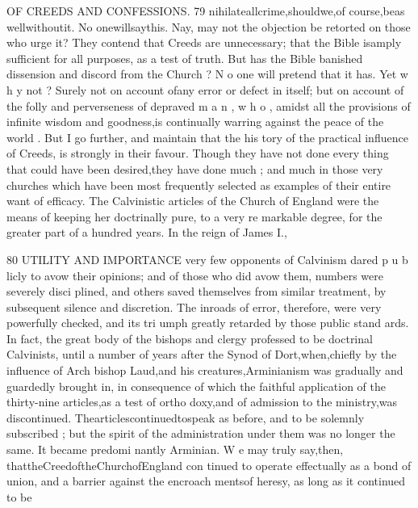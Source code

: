 \documentclass[
]{book}
\begin{document}
OF CREEDS AND CONFESSIONS. 79
nihilateallcrime,shouldwe,of course,beas wellwithoutit. No onewillsaythis. Nay, may not the objection be retorted on those who urge it? They contend that Creeds are unnecessary; that the Bible isamply sufficient
for all purposes, as a test of truth. But has the Bible banished dissension and discord from the Church ? N o one will pretend that it has. Yet w h y not ? Surely not on account ofany error or defect in itself; but on account of the folly and perverseness of depraved m a n , w h o , amidst all the provisions of infinite wisdom and goodness,is continually warring against the peace of the world .
But I go further, and maintain that the his tory of the practical influence of Creeds, is strongly in their favour. Though they have
not done every thing that could have been
desired,they have done much ; and much in
those very churches which have been most
frequently selected as examples of their entire want of efficacy. The Calvinistic articles of
the Church of England were the means of keeping her doctrinally pure, to a very re markable degree, for the greater part of a
hundred years. In the reign of James I.,

80 UTILITY AND IMPORTANCE
very few opponents of Calvinism dared p u b licly to avow their opinions; and of those who
did avow them, numbers were severely disci plined, and others saved themselves from
similar treatment, by subsequent silence and discretion. The inroads of error, therefore,
were very powerfully checked, and its tri
umph greatly retarded by those public stand
ards. In fact, the great body of the bishops
and clergy professed to be doctrinal Calvinists,
until a number of years after the Synod of Dort,when,chiefly by the influence of Arch
bishop Laud,and his creatures,Arminianism was gradually and guardedly brought in, in consequence of which the faithful application
of the thirty-nine articles,as a test of ortho doxy,and of admission to the ministry,was discontinued. Thearticlescontinuedtospeak
as before, and to be solemnly subscribed ; but the spirit of the administration under them was no longer the same. It became predomi nantly Arminian. W e may truly say,then, thattheCreedoftheChurchofEngland con
tinued to operate effectually as a bond of union, and a barrier against the encroach mentsof heresy, as long as it continued to be
\end{document}

